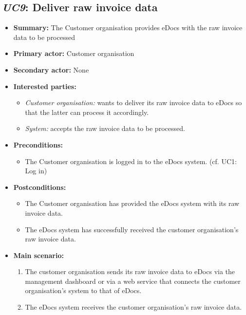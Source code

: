 \documentclass[a4paper,10pt]{article}
\begin{document}
\subsection{\emph{UC9}: Deliver raw invoice data}
\label{usecase:deliverrawinvoicedata}
\begin{itemize}
    \item \textbf{Summary:} The Customer organisation provides eDocs with the raw invoice data to be processed
    \item \textbf{Primary actor:} Customer organisation
    \item \textbf{Secondary actor:} None
    \item \textbf{Interested parties:} 
        \begin{itemize}
            \item \textit{Customer organisation:} wants to deliver its raw invoice data to eDocs so that the latter can process it accordingly.
            \item \textit{System:} accepts the raw invoice data to be processed.
        \end{itemize}
    \item \textbf{Preconditions:}
        \begin{itemize}
            \item The Customer organisation is logged in to the eDocs system. (cf. UC1: Log in)
        \end{itemize}
    \item \textbf{Postconditions:}
        \begin{itemize}
            \item The Customer organisation has provided the eDocs system with its raw invoice data.
            \item The eDocs system has successfully received the customer organisation's raw invoice data.
        \end{itemize}
        
    \item \textbf{Main scenario:} 
    \begin{enumerate}
       \item The customer organisation sends its raw invoice data to eDocs via the management dashboard or via a web service that connects the customer organisation's system to that of eDocs.
       \item The eDocs system receives the customer organisation's raw invoice data.
    \end{enumerate}
\end{itemize}
\end{document}
